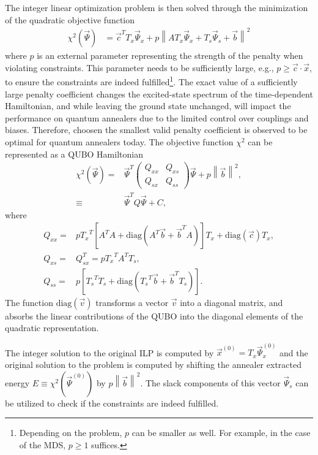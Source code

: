 \documentclass[prd,twocolumn,tightenlines,preprintnumbers,showpacs,superscriptaddress,notitlepage,nofootinbib,eqsecnum,floatfix,longbibliography,aps,10pt]{revtex4-1}
\begin{document}
The integer linear optimization problem is then solved through the minimization of the quadratic objective function
\begin{align}
 \label{eq:ilp-slack-bit-energy}
 \chi^2(\vec \Psi)
 &=
 \vec c^T T_x \vec \Psi_x + p \left\| A T_x \vec \Psi_x + T_s \vec \Psi_s + \vec b \right\|^2
\end{align}
where $p$ is an external parameter representing the strength of the penalty when violating constraints.
This parameter needs to be sufficiently large, e.g., $p \geq \vec c \cdot \vec x$, to ensure the constraints are indeed fulfilled\footnote{Depending on the problem, $p$ can be smaller as well. For example, in the case of the MDS, $p\geq 1$ suffices.}.  The exact value of a sufficiently large penalty coefficient changes the excited-state spectrum of the time-dependent Hamiltonian, and while leaving the ground state unchanged, will impact the performance on quantum annealers due to the limited control over couplings and biases. Therefore, choosen the smallest valid penalty coefficient is observed to be optimal for quantum annealers today.
The objective function $\chi^2$ can be represented as a QUBO Hamiltonian
\begin{align}
 \chi^2(\vec \Psi) =    &
 \vec \Psi^T
 \begin{pmatrix}
  Q_{xx} & Q_{xs} \\
  Q_{sx} & Q_{ss}
 \end{pmatrix}
 \vec \Psi + p\left \| \vec b \right\|^2, \\
 \equiv &  \vec \Psi^T Q  \vec \Psi + C,
 \label{eq:matrix_form}
\end{align}
where
{\small
\begin{align}
 \label{eq:qubo:components}
 Q_{xx} = & p {T_{x}}^T \left[ A^T A + \mathrm{diag} \left(A^T \vec b + \vec b^T A\right) \right] T_x + \mathrm{diag}(\vec c) T_x,                                                                    \\
 Q_{xs} = & Q_{sx}^T = p {T_{x}}^T A^T T_s,                                                                     \\
 Q_{ss} = & p\left[ {T_{s}}^T T_s + \mathrm{diag}\left( {T_{s}}^T \vec b + \vec b^T T_s\right) \right].
\end{align}}
The function $\mathrm{diag}(\vec v)$ transforms a vector $\vec v$ into a diagonal matrix, and absorbs the linear contributions of the QUBO into the diagonal elements of the quadratic representation.

The integer solution to the original ILP is computed by $\vec x^{(0)} = T_x \vec \Psi_x^{(0)}$ and the original solution to the problem is computed by shifting the annealer extracted energy $E \equiv  \chi^2(\vec \Psi^{(0)}) $ by $p \left \| \vec b \right\|^2$.
The slack components of this vector $\vec \Psi_s$ can be utilized to check if the constraints are indeed fulfilled.
\end{document}
